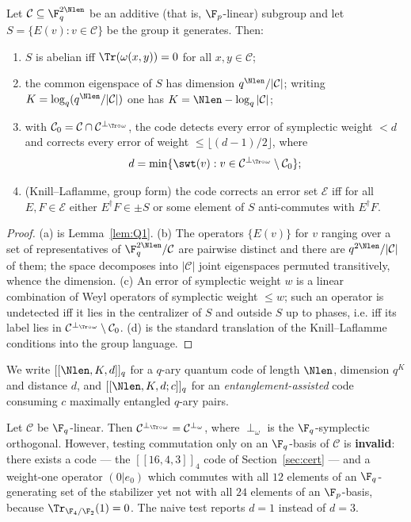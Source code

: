 \begin{lemma}\label{lem:Q2}
Let $\mathcal C\subseteq\F_q^{2\Nlen}$ be an additive (that is, $\F_p$-linear)
subgroup and let $S=\{E(v):v\in\mathcal C\}$ be the group it generates. Then:
\begin{enumerate}[label=\textnormal{(\alph*)},leftmargin=*]
\item $S$ is abelian iff $\Tr(\omega(x,y))=0$ for all $x,y\in\mathcal C$;
\item the common eigenspace of $S$ has dimension $q^{\Nlen}/|\mathcal C|$;
  writing $K=\log_q(q^{\Nlen}/|\mathcal C|)$ one has
  $K=\Nlen-\log_q|\mathcal C|$;
\item with $\mathcal C_0=\mathcal C\cap\mathcal C^{\perp_{\Tr\circ\omega}}$,
  the code detects every error of symplectic weight $<d$ and corrects every
  error of weight $\le\lfloor(d-1)/2\rfloor$, where
  \[
    d=\min\{\swt(v):v\in\mathcal C^{\perp_{\Tr\circ\omega}}\setminus
    \mathcal C_0\};
  \]
\item (Knill--Laflamme, group form) the code corrects an error set
  $\mathcal E$ iff for all $E,F\in\mathcal E$ either $E^\dagger F\in\pm S$ or
  some element of $S$ anti-commutes with $E^\dagger F$.
\end{enumerate}
\end{lemma}

\begin{proof}
(a) is Lemma~\ref{lem:Q1}. (b) The operators $\{E(v)\}$ for $v$ ranging over a
set of representatives of $\F_q^{2\Nlen}/\mathcal C$ are pairwise distinct and
there are $q^{2\Nlen}/|\mathcal C|$ of them; the space decomposes into
$|\mathcal C|$ joint eigenspaces permuted transitively, whence the dimension.
(c) An error of symplectic weight $w$ is a linear combination of Weyl operators
of symplectic weight $\le w$; such an operator is undetected iff it lies in the
centralizer of $S$ and outside $S$ up to phases, i.e. iff its label lies in
$\mathcal C^{\perp_{\Tr\circ\omega}}\setminus\mathcal C_0$. (d) is the standard
translation of the Knill--Laflamme conditions into the group language.
\end{proof}

We write $[[\Nlen,K,d]]_q$ for a $q$-ary quantum code of length $\Nlen$,
dimension $q^K$ and distance $d$, and $[[\Nlen,K,d;c]]_q$ for an
\emph{entanglement-assisted} code consuming $c$ maximally entangled $q$-ary
pairs.

\begin{theorem}\label{thm:fpbasis}
Let $\mathcal C$ be $\F_q$-linear. Then
$\mathcal C^{\perp_{\Tr\circ\omega}}=\mathcal C^{\perp_\omega}$, where
$\perp_\omega$ is the $\F_q$-symplectic orthogonal. However, testing
commutation only on an $\F_q$-basis of $\mathcal C$ is \textbf{invalid}:
there exists a code --- the $[[16,4,3]]_4$ code of
Section~\ref{sec:cert} --- and a weight-one operator $(0|e_0)$ which commutes
with all $12$ elements of an $\F_q$-generating set of the stabilizer yet not
with all $24$ elements of an $\F_p$-basis, because
$\Tr_{\F_4/\F_2}(1)=0$. The naive test reports $d=1$ instead of $d=3$.
\end{theorem}

